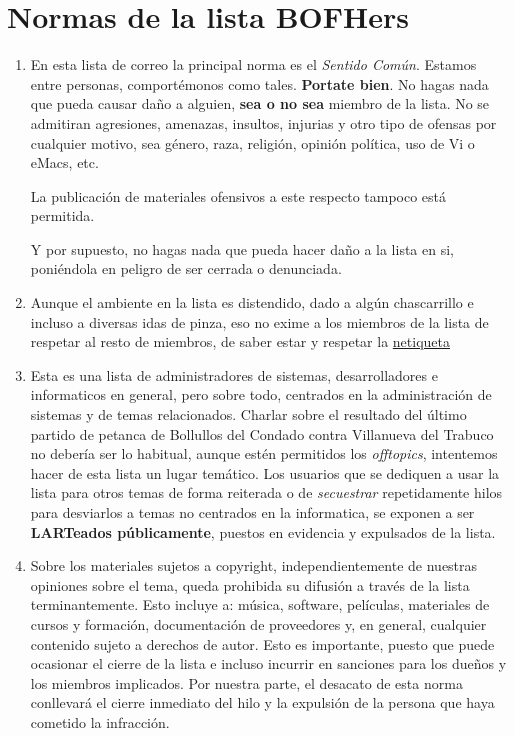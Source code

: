 \documentclass[]{article}
\date{}
\begin{document}
\section{Normas de la lista BOFHers}\label{normas-de-la-lista-bofhers}

\begin{enumerate}
\def\labelenumi{\arabic{enumi}.}
\item
  En esta lista de correo la principal norma es el \emph{Sentido Común}.
  Estamos entre personas, comportémonos como tales. \textbf{Portate
  bien}. No hagas nada que pueda causar daño a alguien, \textbf{sea o no
  sea} miembro de la lista. No se admitiran agresiones, amenazas,
  insultos, injurias y otro tipo de ofensas por cualquier motivo, sea
  género, raza, religión, opinión política, uso de Vi o eMacs, etc.

  La publicación de materiales ofensivos a este respecto tampoco está
  permitida.

  Y por supuesto, no hagas nada que pueda hacer daño a la lista en si,
  poniéndola en peligro de ser cerrada o denunciada.
\item
  Aunque el ambiente en la lista es distendido, dado a algún
  chascarrillo e incluso a diversas idas de pinza, eso no exime a los
  miembros de la lista de respetar al resto de miembros, de saber estar
  y respetar la
  \href{"https://es.wikipedia.org/wiki/Netiqueta\#Aparici.C3.B3n_de_las_reglas"}{netiqueta}
\item
  Esta es una lista de administradores de sistemas, desarrolladores e
  informaticos en general, pero sobre todo, centrados en la
  administración de sistemas y de temas relacionados. Charlar sobre el
  resultado del último partido de petanca de Bollullos del Condado
  contra Villanueva del Trabuco no debería ser lo habitual, aunque estén
  permitidos los \emph{offtopics}, intentemos hacer de esta lista un
  lugar temático. Los usuarios que se dediquen a usar la lista para
  otros temas de forma reiterada o de \emph{secuestrar} repetidamente
  hilos para desviarlos a temas no centrados en la informatica, se
  exponen a ser \textbf{LARTeados públicamente}, puestos en evidencia y
  expulsados de la lista.
\item
  Sobre los materiales sujetos a copyright, independientemente de
  nuestras opiniones sobre el tema, queda prohibida su difusión a través
  de la lista terminantemente. Esto incluye a: música, software,
  películas, materiales de cursos y formación, documentación de
  proveedores y, en general, cualquier contenido sujeto a derechos de
  autor. Esto es importante, puesto que puede ocasionar el cierre de la
  lista e incluso incurrir en sanciones para los dueños y los miembros
  implicados. Por nuestra parte, el desacato de esta norma conllevará el
  cierre inmediato del hilo y la expulsión de la persona que haya
  cometido la infracción.


\end{enumerate}
\end{document}
